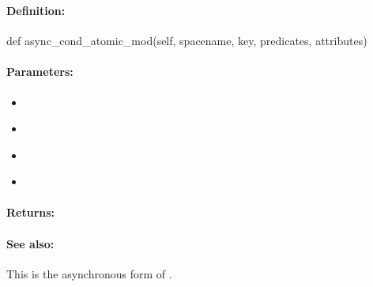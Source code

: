 \pagebreak
\subsubsection{}
\label{api:python:async_cond_atomic_mod}


\paragraph{Definition:}
\begin{pythoncode}
def async_cond_atomic_mod(self, spacename, key, predicates, attributes)
\end{pythoncode}

\paragraph{Parameters:}
\begin{itemize}[noitemsep]
\item {}\\

\item {}\\

\item {}\\

\item {}\\

\end{itemize}

\paragraph{Returns:}


\paragraph{See also:}  This is the asynchronous form of .

\pagebreak
\subsubsection{}
\label{api:python:atomic_and}


